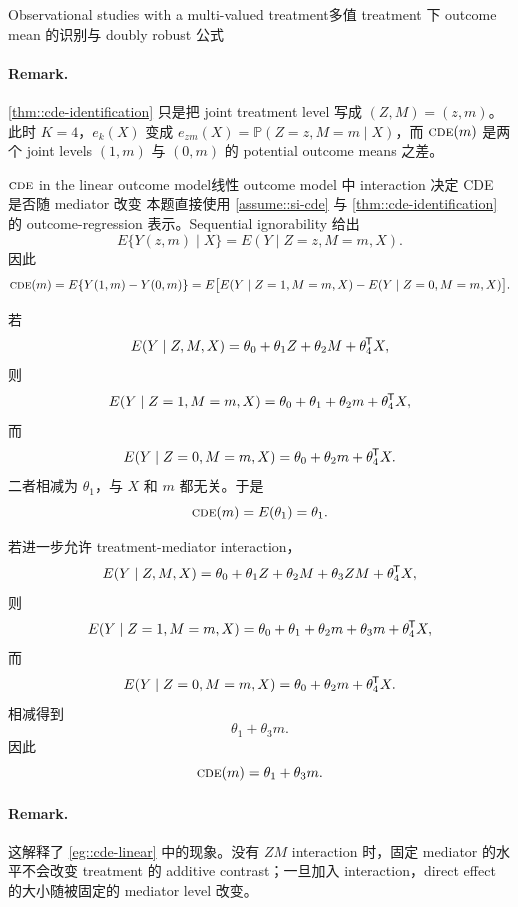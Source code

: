 \begin{exercisesolution}{Observational studies with a multi-valued treatment}{多值 treatment 下 outcome mean 的识别与 doubly robust 公式}
\paragraph{Remark.}
\cref{thm::cde-identification} 只是把 joint treatment level 写成 $(Z,M)=(z,m)$。此时 $K=4$，$e_k(X)$ 变成 $e_{zm}(X)=\mathbb{P}(Z=z,M=m\mid X)$，而 $\textsc{cde}(m)$ 是两个 joint levels $(1,m)$ 与 $(0,m)$ 的 potential outcome means 之差。
\end{exercisesolution}

\begin{exercisesolution}{$\textsc{cde}$ in the linear outcome model}{线性 outcome model 中 interaction 决定 CDE 是否随 mediator 改变}
本题直接使用 \cref{assume::si-cde} 与 \cref{thm::cde-identification} 的 outcome-regression 表示。Sequential ignorability 给出
\[
E\{Y(z,m)\mid X\}=E(Y\mid Z=z,M=m,X).
\]
因此
\[
\textsc{cde}(m)
=
E\{Y(1,m)-Y(0,m)\}
=
E\bigl[
E(Y\mid Z=1,M=m,X)-E(Y\mid Z=0,M=m,X)
\bigr].
\]

若
\[
E(Y\mid Z,M,X)
=
\theta_0+\theta_1 Z+\theta_2 M+\theta_4^{\mkern-1.5mu\mathsf{T}} X,
\]
则
\[
E(Y\mid Z=1,M=m,X)
=
\theta_0+\theta_1+\theta_2 m+\theta_4^{\mkern-1.5mu\mathsf{T}} X,
\]
而
\[
E(Y\mid Z=0,M=m,X)
=
\theta_0+\theta_2 m+\theta_4^{\mkern-1.5mu\mathsf{T}} X.
\]
二者相减为 $\theta_1$，与 $X$ 和 $m$ 都无关。于是
\[
\textsc{cde}(m)=E(\theta_1)=\theta_1.
\]

若进一步允许 treatment-mediator interaction，
\[
E(Y\mid Z,M,X)
=
\theta_0+\theta_1 Z+\theta_2 M+\theta_3 ZM+\theta_4^{\mkern-1.5mu\mathsf{T}} X,
\]
则
\[
E(Y\mid Z=1,M=m,X)
=
\theta_0+\theta_1+\theta_2 m+\theta_3 m+\theta_4^{\mkern-1.5mu\mathsf{T}} X,
\]
而
\[
E(Y\mid Z=0,M=m,X)
=
\theta_0+\theta_2 m+\theta_4^{\mkern-1.5mu\mathsf{T}} X.
\]
相减得到
\[
\theta_1+\theta_3 m.
\]
因此
\[
\textsc{cde}(m)=\theta_1+\theta_3 m.
\]

\paragraph{Remark.}
这解释了 \cref{eg::cde-linear} 中的现象。没有 $ZM$ interaction 时，固定 mediator 的水平不会改变 treatment 的 additive contrast；一旦加入 interaction，direct effect 的大小随被固定的 mediator level 改变。
\end{exercisesolution}

